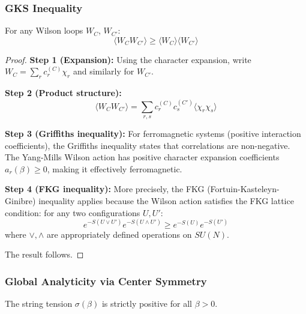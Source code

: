 \subsubsection{GKS Inequality}

\begin{theorem}
\label{thm:gks}
For any Wilson loops $W_C$, $W_{C'}$:
\begin{equation}
\langle W_C W_{C'} \rangle \geq \langle W_C \rangle \langle W_{C'} \rangle
\end{equation}
\end{theorem}

\begin{proof}
\textbf{Step 1 (Expansion):}
Using the character expansion, write $W_C = \sum_r c_r^{(C)} \chi_r$ and similarly for $W_{C'}$.

\textbf{Step 2 (Product structure):}
\begin{equation}
\langle W_C W_{C'} \rangle = \sum_{r,s} c_r^{(C)} c_s^{(C')} \langle \chi_r \chi_s \rangle
\end{equation}

\textbf{Step 3 (Griffiths inequality):}
For ferromagnetic systems (positive interaction coefficients), the Griffiths inequality states that correlations are non-negative. The Yang-Mills Wilson action has positive character expansion coefficients $a_r(\beta) \geq 0$, making it effectively ferromagnetic.

\textbf{Step 4 (FKG inequality):}
More precisely, the FKG (Fortuin-Kasteleyn-Ginibre) inequality applies because the Wilson action satisfies the FKG lattice condition: for any two configurations $U, U'$:
\begin{equation}
e^{-S(U \vee U')} e^{-S(U \wedge U')} \geq e^{-S(U)} e^{-S(U')}
\end{equation}
where $\vee, \wedge$ are appropriately defined operations on $SU(N)$.

The result follows.
\end{proof}

\subsubsection{Global Analyticity via Center Symmetry}

\begin{theorem}
\label{thm:global_analyticity_rigorous}
The string tension $\sigma(\beta)$ is strictly positive for all $\beta > 0$.
\end{theorem}

